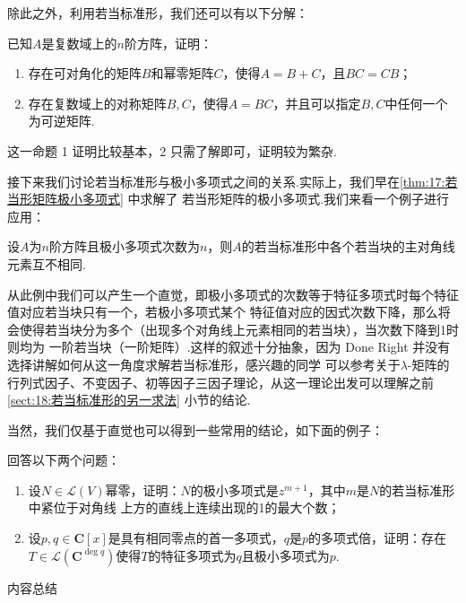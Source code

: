 除此之外，利用若当标准形，我们还可以有以下分解：
\begin{example}
    已知$A$是复数域上的$n$阶方阵，证明：
    \begin{enumerate}
        \item 存在可对角化的矩阵$B$和幂零矩阵$C$，使得$A=B+C$，且$BC=CB$；

        \item 存在复数域上的对称矩阵$B,C$，使得$A=BC$，并且可以指定$B,C$中任何一个为可逆矩阵.
    \end{enumerate}
\end{example}
这一命题 1 证明比较基本，2 只需了解即可，证明较为繁杂.

接下来我们讨论若当标准形与极小多项式之间的关系.实际上，我们早在\autoref{thm:17:若当形矩阵极小多项式} 中求解了
若当形矩阵的极小多项式.我们来看一个例子进行应用：
\begin{example}
    设$A$为$n$阶方阵且极小多项式次数为$n$，则$A$的若当标准形中各个若当块的主对角线元素互不相同.
\end{example}
从此例中我们可以产生一个直觉，即极小多项式的次数等于特征多项式时每个特征值对应若当块只有一个，若极小多项式某个
特征值对应的因式次数下降，那么将会使得若当块分为多个（出现多个对角线上元素相同的若当块），当次数下降到1时则均为
一阶若当块（一阶矩阵）.这样的叙述十分抽象，因为 Done Right 并没有选择讲解如何从这一角度求解若当标准形，感兴趣的同学
可以参考关于$\lambda$-矩阵的行列式因子、不变因子、初等因子三因子理论，从这一理论出发可以理解之前\autoref{sect:18:若当标准形的另一求法}
小节的结论.

当然，我们仅基于直觉也可以得到一些常用的结论，如下面的例子：
\begin{example}
    回答以下两个问题：
    \begin{enumerate}
        \item 设$N\in \mathcal{L}(V)$幂零，证明：$N$的极小多项式是$z^{m+1}$，其中$m$是$N$的若当标准形中紧位于对角线
        上方的直线上连续出现的1的最大个数；

        \item 设$p,q\in\mathbf{C}[x]$是具有相同零点的首一多项式，$q$是$p$的多项式倍，证明：存在
        $T\in \mathcal{L}(\mathbf{C}^{\deg q})$使得$T$的特征多项式为$q$且极小多项式为$p$.
    \end{enumerate}
\end{example}

\vspace{2ex}
\centerline{\heiti \Large 内容总结}

\vspace{2ex}

